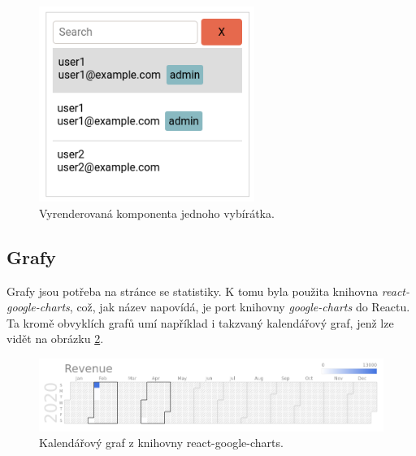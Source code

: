 \begin{figure}[!htb] \centering
  \includegraphics[width=70mm]{../img/picker_component.png}
  \caption{Vyrenderovaná komponenta jednoho vybírátka.}
  \label{fig:picker_component}
\end{figure}

\newpage
\subsection{Grafy}

Grafy jsou potřeba na stránce se statistiky. K tomu byla použita knihovna \textit{react-google-charts},
což, jak název napovídá, je port knihovny \textit{google-charts} do Reactu. Ta kromě obvyklích grafů umí
například i takzvaný kalendářový graf, jenž lze vidět na obrázku \ref{fig:google_charts}.

\begin{figure}[!htb] \centering
  \includegraphics[width=145mm]{../img/google_charts.png}
  \caption{Kalendářový graf z knihovny react-google-charts.}
  \label{fig:google_charts}
\end{figure}

